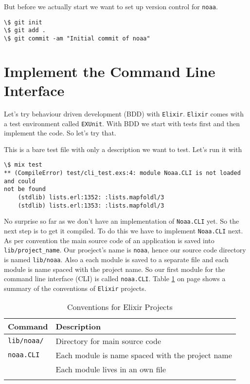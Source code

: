 \documentclass[10pt, a4paper]{article}
\newcommand{\includecode}[3]{}
\begin{document}
But before we actually start we want to set up version control for 
\texttt{noaa}.

\begin{verbatim}
\$ git init
\$ git add .
\$ git commit -am "Initial commit of noaa"
\end{verbatim}

\section{Implement the Command Line Interface}
Let's try behaviour driven development (BDD) with \texttt{Elixir}. 
\texttt{Elixir} comes with a test environment called \texttt{EXUnit}. With BDD
we start with tests first and then implement the code. So let's try that.

\includecode{test/cli\_test.exs}{lst:cli-test}{listings/cli_test.exs}

This is a bare test file with only a description we want to test. Let's run it
with

\begin{verbatim}
\$ mix test
** (CompileError) test/cli_test.exs:4: module Noaa.CLI is not loaded and could
not be found
    (stdlib) lists.erl:1352: :lists.mapfoldl/3
    (stdlib) lists.erl:1353: :lists.mapfoldl/3
\end{verbatim}

No surprise so far as we don't have an implementation of \texttt{Noaa.CLI} yet.
So the next step is to get it compiled. To do this we have to implement
\texttt{Noaa.CLI} next. As per convention the main source code of an 
application is saved into \texttt{lib/project\_name}. Our proeject's name is
\texttt{noaa}, hence our source code directory is named \texttt{lib/noaa}. Also
a each module is saved to a separate file and each module is name spaced with
the project name. So our first module for the command line interface (CLI) is
called \texttt{noaa.CLI}. Table \ref{tbl:conventions} on page 
\pageref{tbl:conventions} shows a summary of the conventions of \texttt{Elixir}
projects.

\begin{table}[h]\footnotesize
  \caption{Conventions for Elixir Projects}
  \begin{tabular}{p{2cm} p{10cm}}
    \hline
    \textbf{Command} & \textbf{Description} \\
    \hline
    \texttt{lib/noaa/} & Directory for main source code \\
    \texttt{noaa.CLI} & Each module is name spaced with the project name \\
                      & Each module lives in an own file \\

    \hline
    \label{tbl:conventions}
  \end{tabular}
\end{table}
\end{document}
